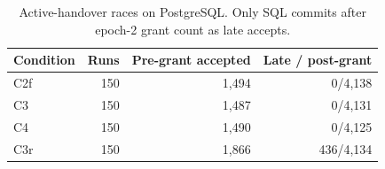 \begin{table}[t]\caption{Active-handover races on PostgreSQL. Only SQL commits after epoch-2 grant count as late accepts.}\label{tab:concurrency}
\centering\footnotesize\setlength{\tabcolsep}{3.5pt}
\begin{tabular}{lrrr}\toprule
Condition & Runs & Pre-grant accepted & Late / post-grant\\\midrule
C2f & 150 & 1,494 & 0/4,138\\
C3 & 150 & 1,487 & 0/4,131\\
C4 & 150 & 1,490 & 0/4,125\\
C3r & 150 & 1,866 & 436/4,134\\\bottomrule
\end{tabular}
\end{table}
